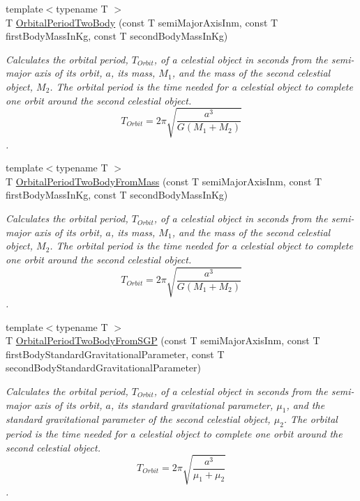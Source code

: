 \begin{DoxyCompactItemize}
{\footnotesize template$<$typename T $>$ }\\T \mbox{\hyperlink{group___e_g_x_phys-_astrophysic-_orbital_period_ga60d2541fdf2108542e52879ae907d81c}{Orbital\+Period\+Two\+Body}} (const T semi\+Major\+Axis\+Inm, const T first\+Body\+Mass\+In\+Kg, const T second\+Body\+Mass\+In\+Kg)
\begin{DoxyCompactList}\small\item\em Calculates the orbital period, $T_{Orbit}$, of a celestial object in seconds from the semi-\/major axis of its orbit, $a$, its mass, $M_1$, and the mass of the second celestial object, $M_2$. The orbital period is the time needed for a celestial object to complete one orbit around the second celestial object. \[ T_{Orbit}=2\pi\sqrt{\dfrac{a^3}{G(M_1 + M_2)}}\]. \end{DoxyCompactList}\item 
{\footnotesize template$<$typename T $>$ }\\T \mbox{\hyperlink{group___e_g_x_phys-_astrophysic-_orbital_period_ga6ec6ae4e31d99bf4d1a27f708dd3247d}{Orbital\+Period\+Two\+Body\+From\+Mass}} (const T semi\+Major\+Axis\+Inm, const T first\+Body\+Mass\+In\+Kg, const T second\+Body\+Mass\+In\+Kg)
\begin{DoxyCompactList}\small\item\em Calculates the orbital period, $T_{Orbit}$, of a celestial object in seconds from the semi-\/major axis of its orbit, $a$, its mass, $M_1$, and the mass of the second celestial object, $M_2$. The orbital period is the time needed for a celestial object to complete one orbit around the second celestial object. \[ T_{Orbit}=2\pi\sqrt{\dfrac{a^3}{G(M_1 + M_2)}}\]. \end{DoxyCompactList}\item 
{\footnotesize template$<$typename T $>$ }\\T \mbox{\hyperlink{group___e_g_x_phys-_astrophysic-_orbital_period_ga53ff53aea547ddedfc69119c4830daea}{Orbital\+Period\+Two\+Body\+From\+S\+GP}} (const T semi\+Major\+Axis\+Inm, const T first\+Body\+Standard\+Gravitational\+Parameter, const T second\+Body\+Standard\+Gravitational\+Parameter)
\begin{DoxyCompactList}\small\item\em Calculates the orbital period, $T_{Orbit}$, of a celestial object in seconds from the semi-\/major axis of its orbit, $a$, its standard gravitational parameter, $\mu_1$, and the standard gravitational parameter of the second celestial object, $\mu_2$. The orbital period is the time needed for a celestial object to complete one orbit around the second celestial object. \[ T_{Orbit}=2\pi\sqrt{\dfrac{a^3}{\mu_1 + \mu_2}}\]. \end{DoxyCompactList}\item 

\end{DoxyCompactItemize}
